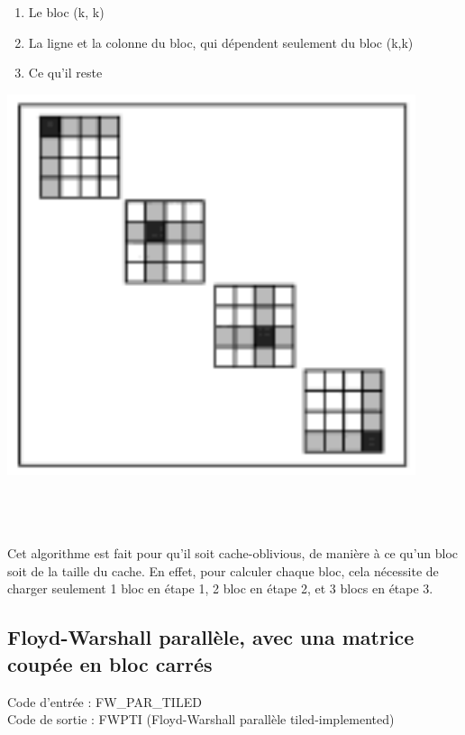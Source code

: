 \documentclass[a4paper,11pt]{article}
\begin{document}
\begin{minipage}{0.50\linewidth}
  \begin{enumerate}
    \item Le bloc (k, k)
    \item La ligne et la colonne du bloc, qui dépendent seulement du bloc (k,k)
    \item Ce qu'il reste
  \end{enumerate}
\end{minipage}\hfill
\begin{minipage}{0.4\linewidth}
  \begin{center}
    \includegraphics[scale=0.5]{FW_SEQ_TILED2.png}
  \end{center}
\end{minipage}
~\\\\\\
\indent Cet algorithme est fait pour qu'il soit cache-oblivious, de manière à ce qu'un bloc soit de la taille du cache. En effet, pour calculer chaque bloc, cela nécessite de charger seulement 1 bloc en étape 1, 2 bloc en étape 2, et 3 blocs en étape 3.

\subsection{Floyd-Warshall parallèle, avec una matrice coupée en bloc carrés}

\noindent Code d'entrée : FW\_PAR\_TILED \\
Code de sortie : FWPTI (Floyd-Warshall parallèle tiled-implemented)\\
\end{document}
